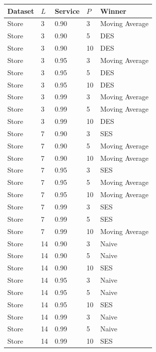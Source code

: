 {\scriptsize
\setlength\tabcolsep{4pt}
\begin{tabular}{lllll}
\toprule Dataset & $L$ & Service & $P$ & Winner \\
\midrule
Store & 3 & 0.90 & 3 & Moving Average \\
Store & 3 & 0.90 & 5 & DES \\
Store & 3 & 0.90 & 10 & DES \\
Store & 3 & 0.95 & 3 & Moving Average \\
Store & 3 & 0.95 & 5 & DES \\
Store & 3 & 0.95 & 10 & DES \\
Store & 3 & 0.99 & 3 & Moving Average \\
Store & 3 & 0.99 & 5 & Moving Average \\
Store & 3 & 0.99 & 10 & DES \\
Store & 7 & 0.90 & 3 & SES \\
Store & 7 & 0.90 & 5 & Moving Average \\
Store & 7 & 0.90 & 10 & Moving Average \\
Store & 7 & 0.95 & 3 & SES \\
Store & 7 & 0.95 & 5 & Moving Average \\
Store & 7 & 0.95 & 10 & Moving Average \\
Store & 7 & 0.99 & 3 & SES \\
Store & 7 & 0.99 & 5 & SES \\
Store & 7 & 0.99 & 10 & Moving Average \\
Store & 14 & 0.90 & 3 & Naive \\
Store & 14 & 0.90 & 5 & Naive \\
Store & 14 & 0.90 & 10 & SES \\
Store & 14 & 0.95 & 3 & Naive \\
Store & 14 & 0.95 & 5 & Naive \\
Store & 14 & 0.95 & 10 & SES \\
Store & 14 & 0.99 & 3 & Naive \\
Store & 14 & 0.99 & 5 & Naive \\
Store & 14 & 0.99 & 10 & SES \\
\bottomrule
\end{tabular}}
